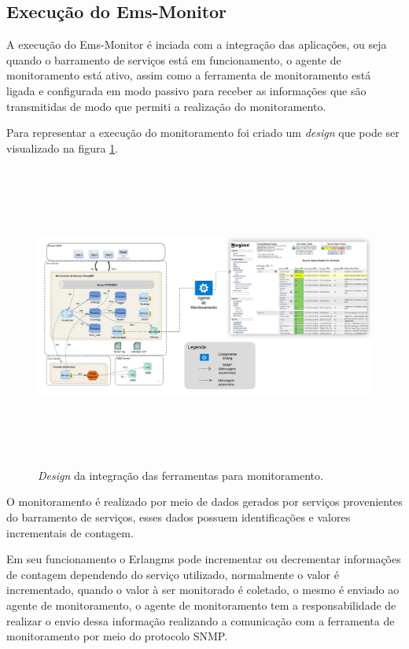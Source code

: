 
\subsection{Execução do Ems-Monitor}

A execução do Ems-Monitor é inciada com a integração das aplicações, ou seja quando o barramento de serviços está em funcionamento, o agente de monitoramento está ativo, assim como a ferramenta de monitoramento está ligada e configurada em modo passivo para receber as informações que são transmitidas de modo que permiti a realização do monitoramento. 

Para representar a execução do monitoramento foi criado um \textit{design} que pode ser visualizado na figura \ref{fun:fig:arqtProjeto}. 

\begin{figure}[H]
	\begin{center}
	\includegraphics[width = 18cm, height = 10cm]{img/arqtProjeto.jpeg}
	\caption{\textit{Design} da integração das ferramentas para monitoramento.}
	\label{fun:fig:arqtProjeto}
	\end{center}
\end{figure}


O monitoramento é realizado por meio de dados gerados por serviços provenientes do barramento de serviços, esses dados possuem identificações e valores incrementais de contagem. 

Em seu funcionamento o Erlangms pode incrementar ou decrementar informações de contagem dependendo do serviço utilizado, normalmente o valor é incrementado, quando o valor à ser monitorado é coletado, o mesmo é enviado ao agente de monitoramento, o agente de monitoramento tem a responsabilidade de realizar o envio dessa informação realizando a comunicação com a ferramenta de monitoramento por meio do protocolo \acrshort{SNMP}. 


